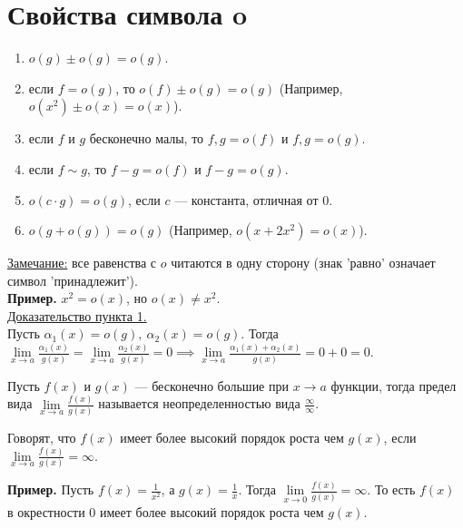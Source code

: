 \documentclass{article}
\begin{document}
\section{Свойства символа o}
\begin{enumerate}[leftmargin=*]
  \item \(o(g) \pm o(g) = o(g)\).
  \item если \(f = o(g)\), то \(o(f) \pm o(g) = o(g)\) (Например, \(o(x^2) \pm o(x) = o(x)\)).     
  \item если \(f\) и \(g\) бесконечно малы, то \(f, g = o(f)\) и \(f, g = o(g)\).
  \item если \(f \sim g\), то \(f - g = o(f)\) и \(f - g = o(g)\).
  \item \(o(c \cdot g) = o(g)\), если \(c\) --- константа, отличная от 0.
  \item \(o(g + o(g)) = o(g)\) (Например, \(o(x + 2x^2) = o(x)\)).     
\end{enumerate}
\noindent
\underline{Замечание:} все равенства с \(o\) читаются в одну сторону (знак 'равно' означает символ 'принадлежит').\\[0.1cm]
\textbf{Пример.} \(x^2 = o(x)\), но \(o(x) \neq x^2\).\\
\underline{Доказательство пункта 1.}\\
Пусть \(\displaystyle \alpha_{1}(x) = o(g),\ \alpha_{2}(x) = o(g)\). Тогда \(\displaystyle \lim\limits_{x \to a}\frac{\alpha_{1}(x)}{g(x)} = \lim\limits_{x \to a}\frac{\alpha_{2}(x)}{g(x)} = 0 \implies \lim\limits_{x \to a} \frac{\alpha_{1}(x) + \alpha_{2}(x)}{g(x)} = 0 + 0 = 0\).

\begin{definition}
    Пусть \(f(x)\) и \(g(x)\) --- бесконечно большие при \(x \to a\) функции, тогда предел вида \(\displaystyle \lim\limits_{x \to a}\frac{f(x)}{g(x)}\) называется неопределенностью вида \(\displaystyle \frac{\infty}{\infty}\).   
\end{definition}

\begin{definition}
    Говорят, что \(f(x)\) имеет более высокий порядок роста чем \(g(x)\), если \(\displaystyle \lim\limits_{x \to a}\frac{f(x)}{g(x)} = \infty\).   
\end{definition}
\noindent
\textbf{Пример.} Пусть \(\displaystyle f(x) = \frac{1}{x^2}\), а \(\displaystyle g(x) = \frac{1}{x}\). Тогда \(\displaystyle \lim\limits_{x \to 0}\frac{f(x)}{g(x)} = \infty\). То есть \(f(x)\) в окрестности 0 имеет более высокий порядок роста чем \(g(x)\).
\end{document}

